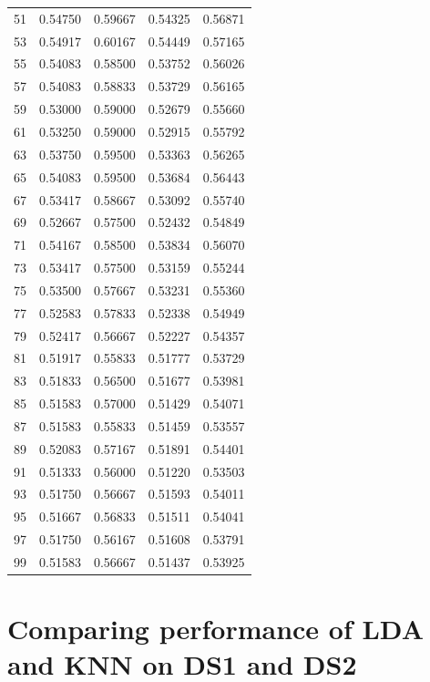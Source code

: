 \documentclass{article}
\begin{document}
\begin{center}
\begin{tabular}{ |c|c|c|c|c| }
    51 &  0.54750 &  0.59667 &  0.54325 &  0.56871 \\
    53 &  0.54917 &  0.60167 &  0.54449 &  0.57165 \\
    55 &  0.54083 &  0.58500 &  0.53752 &  0.56026 \\
    57 &  0.54083 &  0.58833 &  0.53729 &  0.56165 \\
    59 &  0.53000 &  0.59000 &  0.52679 &  0.55660 \\
    61 &  0.53250 &  0.59000 &  0.52915 &  0.55792 \\
    63 &  0.53750 &  0.59500 &  0.53363 &  0.56265 \\
    65 &  0.54083 &  0.59500 &  0.53684 &  0.56443 \\
    67 &  0.53417 &  0.58667 &  0.53092 &  0.55740 \\
    69 &  0.52667 &  0.57500 &  0.52432 &  0.54849 \\
    71 &  0.54167 &  0.58500 &  0.53834 &  0.56070 \\
    73 &  0.53417 &  0.57500 &  0.53159 &  0.55244 \\
    75 &  0.53500 &  0.57667 &  0.53231 &  0.55360 \\
    77 &  0.52583 &  0.57833 &  0.52338 &  0.54949 \\
    79 &  0.52417 &  0.56667 &  0.52227 &  0.54357 \\
    81 &  0.51917 &  0.55833 &  0.51777 &  0.53729 \\
    83 &  0.51833 &  0.56500 &  0.51677 &  0.53981 \\
    85 &  0.51583 &  0.57000 &  0.51429 &  0.54071 \\
    87 &  0.51583 &  0.55833 &  0.51459 &  0.53557 \\
    89 &  0.52083 &  0.57167 &  0.51891 &  0.54401 \\
    91 &  0.51333 &  0.56000 &  0.51220 &  0.53503 \\
    93 &  0.51750 &  0.56667 &  0.51593 &  0.54011 \\
    95 &  0.51667 &  0.56833 &  0.51511 &  0.54041 \\
    97 &  0.51750 &  0.56167 &  0.51608 &  0.53791 \\
    99 &  0.51583 &  0.56667 &  0.51437 &  0.53925 \\
    \hline
\end{tabular}
\end{center}

\section{Comparing performance of LDA and KNN on DS1 and DS2}
\end{document}
